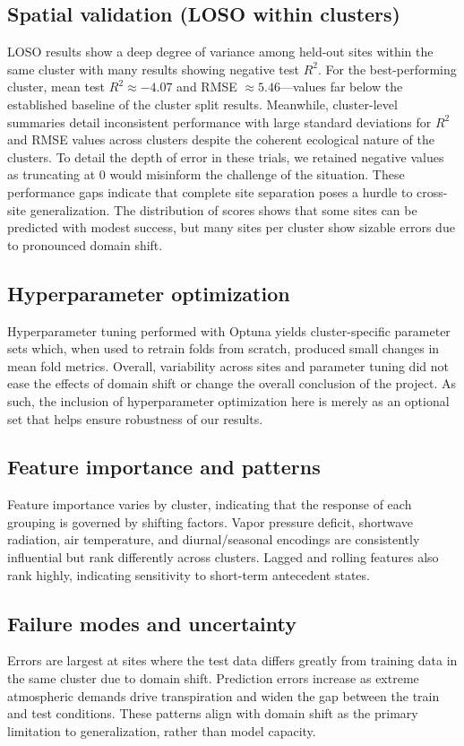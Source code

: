 \documentclass[graybox]{svmult}
\begin{document}
\subsection{Spatial validation (LOSO within clusters)}
LOSO results show a deep degree of variance among held-out sites within the same cluster with many results showing negative test $R^2$. For the best-performing cluster, mean test $R^2\approx -4.07$ and RMSE $\approx 5.46$—values far below the established baseline of the cluster split results. Meanwhile, cluster-level summaries detail inconsistent performance with large standard deviations for $R^2$ and RMSE values across clusters despite the coherent ecological nature of the clusters. To detail the depth of error in these trials, we retained negative values as truncating at 0 would misinform the challenge of the situation. These performance gaps indicate that complete site separation poses a hurdle to cross-site generalization. The distribution of scores shows that some sites can be predicted with modest success, but many sites per cluster show sizable errors due to pronounced domain shift.

\subsection{Hyperparameter optimization}
Hyperparameter tuning performed with Optuna yields cluster-specific parameter sets which, when used to retrain folds from scratch, produced small changes in mean fold metrics. Overall, variability across sites and parameter tuning did not ease the effects of domain shift or change the overall conclusion of the project. As such, the inclusion of hyperparameter optimization here is merely as an optional set that helps ensure robustness of our results.

\subsection{Feature importance and patterns}
Feature importance varies by cluster, indicating that the response of each grouping is governed by shifting factors. Vapor pressure deficit, shortwave radiation, air temperature, and diurnal/seasonal encodings are consistently influential but rank differently across clusters. Lagged and rolling features also rank highly, indicating sensitivity to short-term antecedent states.

\subsection{Failure modes and uncertainty}
Errors are largest at sites where the test data differs greatly from training data in the same cluster due to domain shift. Prediction errors increase as extreme atmospheric demands drive transpiration and widen the gap between the train and test conditions. These patterns align with domain shift as the primary limitation to generalization, rather than model capacity.
\end{document}
